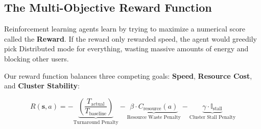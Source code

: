 \documentclass[11pt,a4paper]{article}
\begin{document}
\subsection{The Multi-Objective Reward Function}
Reinforcement learning agents learn by trying to maximize a numerical score called the \textbf{Reward}. If the reward only rewarded speed, the agent would greedily pick Distributed mode for everything, wasting massive amounts of energy and blocking other users.

Our reward function balances three competing goals: \textbf{Speed}, \textbf{Resource Cost}, and \textbf{Cluster Stability}:

\begin{equation}
    R(\mathbf{s}, a) = - \underbrace{\left( \frac{T_{\text{actual}}}{T_{\text{baseline}}} \right)}_{\text{Turnaround Penalty}} - \underbrace{\beta \cdot C_{\text{resource}}(a)}_{\text{Resource Waste Penalty}} - \underbrace{\gamma \cdot \mathbb{I}_{\text{stall}}}_{\text{Cluster Stall Penalty}}
\end{equation}
\end{document}
